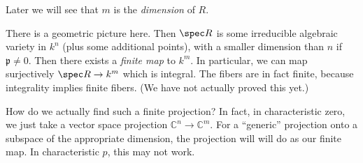 Later we will see that $m$ is the \emph{dimension} of $R$.

There is a geometric picture here. Then $\spec R$ is some irreducible algebraic
variety in $k^n$ (plus some additional points), with a smaller dimension than
$n$ if $\mathfrak{p} \neq 0$. Then there exists a \emph{finite map} to $k^m$.
In particular, we can map surjectively $\spec R \to k^m$ which is integral.
The fibers are in fact finite, because integrality implies finite fibers.  (We
have not actually proved this yet.)

How do we actually find such a finite projection? In fact, in characteristic
zero, we just take a
vector space projection $\mathbb{C}^n \to \mathbb{C}^m$. For a ``generic''
projection onto a subspace of the appropriate dimension, the projection will
will do as our finite map. In characteristic $p$, this may not work.

